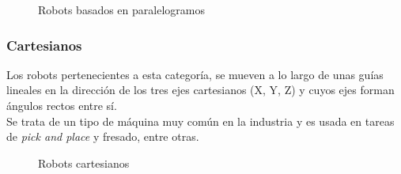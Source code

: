 \begin{figure} [ht!]
  \centering    
  \hspace{1cm}
  \caption{Robots basados en paralelogramos}
\end{figure}

\newpage
\subsubsection{Cartesianos}
Los robots pertenecientes a esta categoría, se mueven a lo largo de unas guías lineales en la dirección de los tres ejes cartesianos (X, Y, Z) y cuyos ejes forman ángulos rectos entre sí. \\
Se trata de un tipo de máquina muy común en la industria y es usada en tareas de \textit{pick and place} y fresado, entre otras.

\begin{figure} [h!]
  \centering    
  \hspace{1cm}
  \caption{Robots cartesianos}
\end{figure}

